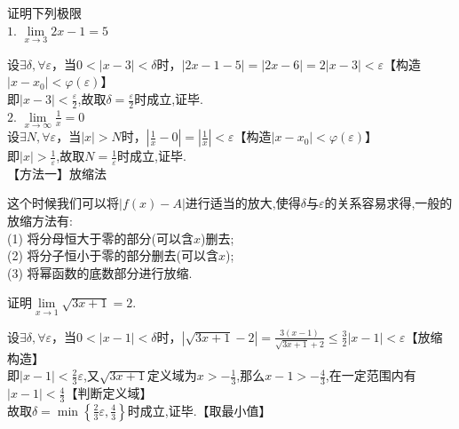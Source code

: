 \examples 证明下列极限\\[0.5em]
\hspace*{0.8em} $1.\,\,\lim\limits_{x \to 3}2x-1=5$

\proof  设$\exists \delta,\forall \varepsilon$，当$0<|x-3|<\delta $时，$|2x-1-5|=|2x-6|=2|x-3|<\varepsilon$\quad \quad 【构造$|x-x_0 | < \varphi (\varepsilon)$】\\[0.5em]
即$\displaystyle |x-3|<\frac{\varepsilon}{2}$,故取$\displaystyle \delta = \frac{\varepsilon}{2}$时成立,证毕.\\[1.5em]
\hspace*{0.8em} $2.\,\,\displaystyle \lim\limits_{x \to \infty }\frac{1}{x}=0$\\[1em]
\proof  设$\exists N,\forall \varepsilon$，当$|x|>N$时，$\displaystyle \left| \frac{1}{x}-0\right| =\left| \frac{1}{x}\right|<\varepsilon$\hspace{13em}【构造$|x-x_0 | < \varphi (\varepsilon)$】\\[0.5em]
即$\displaystyle |x|>\frac{1}{\varepsilon}$,故取$\displaystyle N = \frac{1}{\varepsilon}$时成立,证毕.\\

\noindent 【方法一】放缩法\vspace{0.8em}
\par 这个时候我们可以将$|f (x) - A|$进行适当的放大,使得$\delta $与$\varepsilon$的关系容易求得,一般的放缩方法有:\\[0.5em]
\noindent (1)  将分母恒大于零的部分(可以含$x$)删去;\\[0.5em]
\noindent (2)  将分子恒小于零的部分删去(可以含$x$);\\[0.5em]
\noindent (3)  将幂函数的底数部分进行放缩.

\examples 证明$\displaystyle \lim\limits_{x \to 1}\sqrt{3x+1}=2.$

\proof 设$\exists \delta,\forall \varepsilon$，当$0<|x-1|<\delta $时，$\displaystyle |\sqrt{3x+1}-2|=\frac{3(x-1)}{\sqrt{3x+1}+2}\le \frac{3}{2}|x-1|<\varepsilon$\hspace{4em}【放缩构造】\\[0.5em]
即$\displaystyle |x-1|<\frac{2}{3}\varepsilon$,又$\displaystyle \sqrt{3x+1}$定义域为$\displaystyle x>-\frac{1}{3}$,那么$\displaystyle x-1>-\frac{4}{3}$,在一定范围内有$\displaystyle |x-1|<\frac{4}{3}$\hspace{1em}【判断定义域】\\[0.5em]
故取$\displaystyle \delta = \min \left\lbrace  \frac{2}{3}\varepsilon,\frac{4}{3} \right\rbrace $时成立,证毕.\hspace{27em}【取最小值】\\

